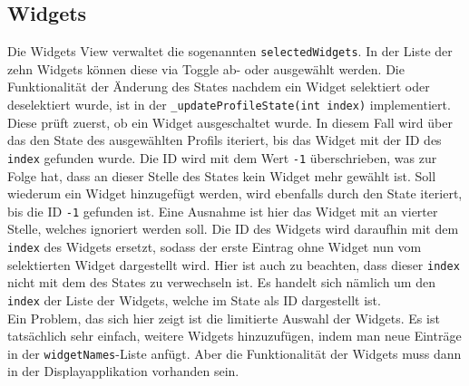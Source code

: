 \subsection{Widgets}
Die Widgets View verwaltet die sogenannten \texttt{selectedWidgets}. In der Liste der zehn Widgets können diese via Toggle ab- oder ausgewählt werden. Die Funktionalität der Änderung des States nachdem ein Widget selektiert oder deselektiert wurde, ist in der \texttt{\_updateProfileState(int index)} implementiert. Diese prüft zuerst, ob ein Widget ausgeschaltet wurde. In diesem Fall wird über das den State des ausgewählten Profils iteriert, bis das Widget mit der ID des \texttt{index} gefunden wurde. Die ID wird mit dem Wert \texttt{-1} überschrieben, was zur Folge hat, dass an dieser Stelle des States kein Widget mehr gewählt ist. Soll wiederum ein Widget hinzugefügt werden, wird ebenfalls durch den State iteriert, bis die ID \texttt{-1} gefunden ist. Eine Ausnahme ist hier das Widget mit an vierter Stelle, welches ignoriert werden soll. Die ID des Widgets wird daraufhin mit dem \texttt{index} des Widgets ersetzt, sodass der erste Eintrag ohne Widget nun vom selektierten Widget dargestellt wird. Hier ist auch zu beachten, dass dieser \texttt{index} nicht mit dem des States zu verwechseln ist. Es handelt sich nämlich um den \texttt{index} der Liste der Widgets, welche im State als ID dargestellt ist. \\
Ein Problem, das sich hier zeigt ist die limitierte Auswahl der Widgets. Es ist tatsächlich sehr einfach, weitere Widgets hinzuzufügen, indem man neue Einträge in der \texttt{widgetNames}-Liste anfügt. Aber die Funktionalität der Widgets muss dann in der Displayapplikation vorhanden sein.

